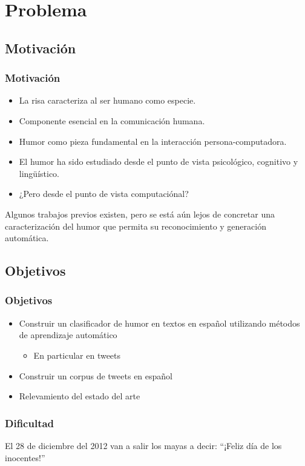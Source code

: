 \section{Problema} 

\subsection{Motivación}

\begin{frame}[allowframebreaks]
    \frametitle{Motivación}
    \begin{itemize}
        \item La risa caracteriza al ser humano como especie.
        \item Componente esencial en la comunicación humana.
        \item Humor como pieza fundamental en la interacción persona-computadora.
    \end{itemize}

    \framebreak
    
    \begin{itemize}
        \item El humor ha sido estudiado desde el punto de vista psicológico, cognitivo y lingüístico.
        \item ¿Pero desde el punto de vista computaciónal?
    \end{itemize}
    Algunos trabajos previos existen, pero se está aún lejos de concretar una caracterización del humor que permita su reconocimiento y generación automática.
\end{frame}

\subsection{Objetivos}

\begin{frame}
    \frametitle{Objetivos}
    \begin{itemize}
        \item Construir un clasificador de humor en textos en español utilizando métodos de aprendizaje automático
            \begin{itemize}
                \item En particular en tweets
            \end{itemize}
        \item Construir un corpus de tweets en español
        \item Relevamiento del estado del arte
    \end{itemize}
\end{frame}


\begin{frame}
    \frametitle{Dificultad}
    El 28 de diciembre del 2012 van a salir los mayas a decir: ``¡Feliz día de los inocentes!''
\end{frame}
